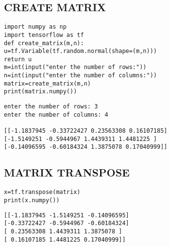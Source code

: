 \subsection{CREATE MATRIX}
\vspace{-.75cm}
\begin{code}
\begin{lstlisting}
import numpy as np
import tensorflow as tf
def create_matrix(m,n):
u=tf.Variable(tf.random.normal(shape=(m,n)))
return u
m=int(input("enter the number of rows:"))
n=int(input("enter the number of columns:"))
matrix=create_matrix(m,n)
print(matrix.numpy())

\end{lstlisting}
\end{code}
\vspace{-1cm}
\begin{verbatim}
enter the number of rows: 3
enter the number of columns: 4

[[-1.1837945 -0.33722427 0.23563308 0.16107185]
[-1.5149251 -0.5944967 1.4439311 1.4481225 ]
[-0.14096595 -0.60184324 1.3875078 0.17040999]]

\end{verbatim}
\vspace{-.6cm}
\subsection{MATRIX TRANSPOSE}
\vspace{-.75cm}
\begin{code}
\begin{lstlisting}
x=tf.transpose(matrix)
print(x.numpy())
\end{lstlisting}
\end{code}
\vspace{-1cm}
\begin{verbatim}
[[-1.1837945 -1.5149251 -0.14096595]
[-0.33722427 -0.5944967 -0.60184324]
[ 0.23563308 1.4439311 1.3875078 ]
[ 0.16107185 1.4481225 0.17040999]]
\end{verbatim}
\vspace{-.75cm}
\newpage
